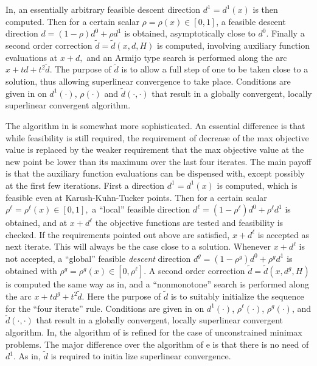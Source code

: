 In\Lspace {}\Rcitemark \Rspace{},
an essentially arbitrary feasible descent direction $d^1=d^{1}(x)$ is 
then computed. Then for a certain 
scalar $\rho =\rho (x)\in [0,1]$, a feasible descent 
direction $d=(1-\rho)d^0+\rho d^1$ is obtained, asymptotically 
close to $d^0.$ Finally a second order 
correction $\tilde d=\tilde{d}(x,d,H)$ is computed, involving
auxiliary function evaluations at $x+d,$ 
and an Armijo type search is performed along the 
arc $x+td+t^2 \tilde d.$
The purpose of $\tilde d$ is to allow a full step of one to be taken
close to a solution, thus allowing superlinear convergence to 
take place. Conditions are given 
in\Lspace {}\Rcitemark \Rspace{} on 
$d^{1}(\cdot)$, $\rho(\cdot)$ and $\tilde d(\cdot ,\cdot)$ 
that result in a globally convergent, 
locally superlinear convergent algorithm.

The algorithm in\Lspace {}\Rcitemark \Rspace{} is somewhat
more sophisticated. An essential difference is that while feasibility
is still required, the requirement of decrease of the max objective
value is replaced by the weaker requirement that the max
objective value at the new point be lower than its maximum over the last
four iterates. The main payoff is that the auxiliary function 
evaluations
can be dispensed with, except possibly at the first few iterations.
First a direction $d^1=d^1(x)$ is computed, which is feasible even at
Karush-Kuhn-Tucker points. Then for a certain 
scalar $\rho ^{\ell} =\rho  ^{\ell}(x)\in [0,1],$ 
a ``local'' feasible 
direction $d ^{\ell}=(1-\rho ^{\ell})d^0+\rho  ^{\ell}d^1$ is obtained, 
and at $x+d^{\ell}$ the objective functions are tested 
and feasibility is
checked. If the requirements pointed out above are satisfied, $x+d^\ell$
is accepted as next iterate. This will always be the case close to a
solution. Whenever $x+d^\ell$ is not accepted, a ``global'' 
feasible {\it descent}
direction $d ^g=(1-\rho ^g)d^0+\rho  ^gd^1$ is obtained with
$\rho ^g =\rho  ^g(x)\in [0,\rho ^{\ell}].$ 
A second order correction $\tilde d=\tilde{d}(x,d^g,H)$ is computed
the same way as in\Lspace {}\Rcitemark \Rspace{},
and a ``nonmonotone'' search is performed along the 
arc $x+td^g+t^2 \tilde d.$ 
Here the purpose of $\tilde d$ 
is to suitably initialize the sequence for the ``four iterate'' rule.
Conditions are given in\Lspace {}\Rcitemark \Rspace{} on 
$d^{1}(\cdot)$, $\rho ^{\ell}(\cdot)$, $\rho ^g(\cdot)$, 
and $\tilde d(\cdot ,\cdot)$ that result in a 
globally convergent, locally superlinear convergent algorithm.
In\Lspace {}\Rcitemark \Rspace{}, the algorithm of\Lspace {}\Rcitemark \Rspace{} is refined
for the case of unconstrained minimax problems.
The major difference over the algorithm of\Lspace {}\Rcitemark \Rspac
e{} 
is that there is no need of $d^1$.
As in\Lspace {}\Rcitemark \Rspace{}, $\tilde d$ is required to initia
lize superlinear
convergence.
 
